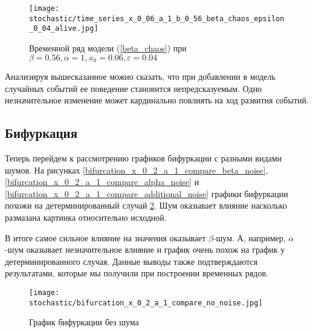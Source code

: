         \begin{figure}
            \centering
            \texttt{[image: stochastic/time\_series\_x\_0\_06\_a\_1\_b\_0\_56\_beta\_chaos\_epsilon\_0\_04\_alive.jpg]}
        
            \captionsetup{justification=centering}
            \caption{Временной ряд модели (\ref{beta_chaos}) при \(\beta = 0.56, \alpha = 1, x_0 = 0.06, \varepsilon = 0.04\)}
            \label{time_series_x_0_06_a_1_b_0_56_beta_chaos_epsilon_0_04_alive}
        \end{figure}

        Анализируя вышесказанное можно сказать, что при добавлении в модель случайных событий ее поведение становится непредсказуемым. Одно незначительное изменение может кардинально повлиять на ход развития событий. 


    \subsection{Бифуркация}

        Теперь перейдем к рассмотрению графиков бифуркации с разными видами шумов. На рисунках \ref{bifurcation_x_0_2_a_1_compare_beta_noise}, \ref{bifurcation_x_0_2_a_1_compare_alpha_noise} и \ref{bifurcation_x_0_2_a_1_compare_additional_noise} графики бифуркации похожи на детерминированный случай \ref{bifurcation_x_0_2_a_1_compare_no_noise}. Шум оказывает влияние насколько размазана картинка относительно исходной. 

        В итоге самое сильное влияние на значения оказывает \(\beta\)-шум. А, например, \(\alpha\)-шум оказывает незначительное влияние и график очень похож на график у детерминированного случая. Данные выводы также подтверждаются результатами, которые мы получили при построении временных рядов.


        \begin{figure}
            \centering
            \texttt{[image: stochastic/bifurcation\_x\_0\_2\_a\_1\_compare\_no\_noise.jpg]}
        
            \captionsetup{justification=centering}
            \caption{График бифуркации без шума}
            \label{bifurcation_x_0_2_a_1_compare_no_noise}
        \end{figure}

